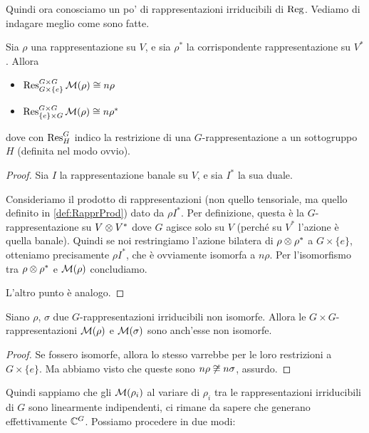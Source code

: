 	Quindi ora conosciamo un po' di rappresentazioni irriducibili di $\operatorname{Reg}$. Vediamo di indagare meglio come sono fatte.
	
	\begin{myprop}
		Sia $\rho$ una rappresentazione su $V$, e sia $\rho^*$ la corrispondente rappresentazione su $V^*$. Allora
		\begin{itemize}
		 \item $\operatorname{Res}_{G\times \{e\}}^{G\times G}\mathcal M(\rho) \cong n\rho$
		 \item $\operatorname{Res}_{\{e\}\times G}^{G\times G}\mathcal M(\rho) \cong n\rho^*$
		\end{itemize}
		dove con $\operatorname{Res}_H^G$ indico la restrizione di una $G$-rappresentazione a un sottogruppo $H$ (definita nel modo ovvio).
	 
	\end{myprop}

	\begin{proof}
		Sia $I$ la rappresentazione banale su $V$, e sia $I^*$ la sua duale. 

		Consideriamo il prodotto di rappresentazioni (non quello tensoriale, ma quello definito in \ref{def:RapprProd}) dato da $\rho I^*$. Per definizione, questa è la $G$-rappresentazione su $V\otimes V^*$ dove $G$ agisce solo su $V$ (perché su $V^*$ l'azione è quella banale). Quindi se noi restringiamo l'azione bilatera di $\rho \otimes \rho^*$ a $G \times \{e\}$, otteniamo precisamente $\rho I^*$, che è ovviamente isomorfa a $n\rho$. Per l'isomorfismo tra $\rho \otimes \rho^*$ e $\mathcal M(\rho)$ concludiamo.
		
		L'altro punto è analogo.
	\end{proof}		
	
	\begin{myprop}
	 Siano $\rho$, $\sigma$ due $G$-rappresentazioni irriducibili non isomorfe. Allora le $G\times G$-rappresentazioni $\mathcal M(\rho)$ e $\mathcal M(\sigma)$ sono anch'esse non isomorfe.
	\end{myprop}
	
	\begin{proof}
	 Se fossero isomorfe, allora lo stesso varrebbe per le loro restrizioni a $G \times \{e\}$. Ma abbiamo visto che queste sono $n\rho \not\cong n\sigma$, assurdo.
	\end{proof}
	
	Quindi sappiamo che gli $\mathcal M(\rho_i)$ al variare di $\rho_i$ tra le rappresentazioni irriducibili di $G$ sono linearmente indipendenti, ci rimane da sapere che generano effettivamente $\mathbb C^{G}$. Possiamo procedere in due modi:
	
